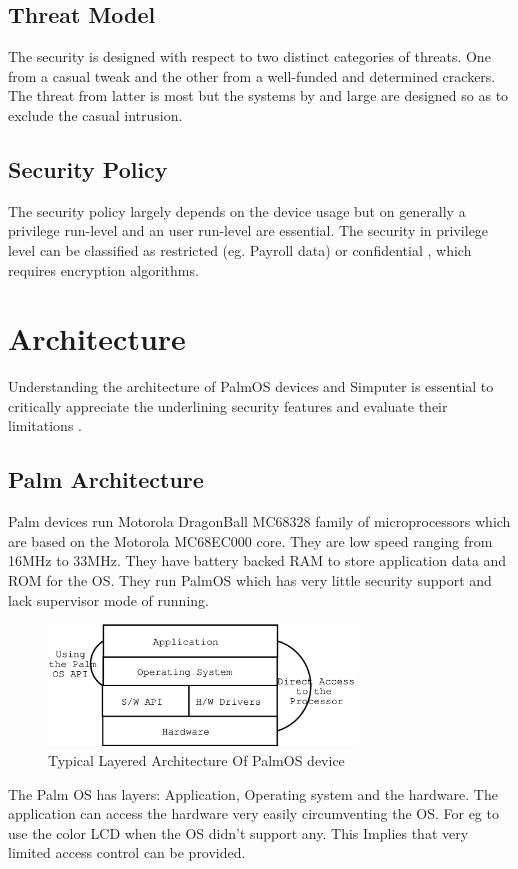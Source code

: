 \documentclass[11pt]{article}
\begin{document}
\subsection{Threat Model}
The security is designed with respect to two distinct categories of threats. One from a casual tweak and the other from a well-funded and determined crackers. The threat from latter is most but the systems by and large are designed so as to exclude the casual intrusion.

\subsection{Security Policy}
The security policy largely depends on the device usage but on generally a privilege run-level and an user run-level are essential. The security in privilege level can be classified as restricted (eg. Payroll data) or confidential \cite{pocketpc}, which requires encryption algorithms.

\section{Architecture}
Understanding the architecture of PalmOS devices and Simputer is essential to critically appreciate the underlining security features and evaluate their limitations .
\subsection{Palm Architecture}
Palm devices run Motorola DragonBall MC68328 family of microprocessors which are based on the Motorola MC68EC000 core. They are low speed ranging from 16MHz to 33MHz. They have battery backed RAM to store application data and ROM for the OS. They run PalmOS which has very little security support and lack supervisor mode of running.

\begin{figure}[h]
\centerline{
\includegraphics[width=3.2in]{palmarc.eps}
}
\caption{Typical Layered Architecture Of PalmOS device\cite{mudge01}}
\end{figure}

The Palm OS has layers: Application, Operating system and the hardware. The application can access the hardware very easily circumventing the OS. For eg to use the color LCD when the OS didn't support any. This Implies that very limited access control can be provided.
\end{document}
